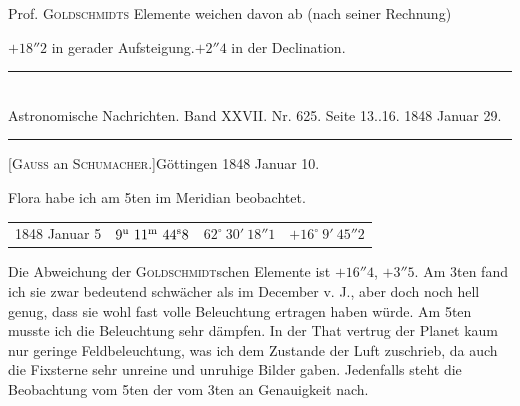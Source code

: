 Prof. \textsc{Goldschmidts} Elemente weichen davon ab (nach seiner Rechnung)

\begin{center}
$+18''2$ in gerader Aufsteigung.\qquad $+2''4$ in der Declination.
\end{center}

\clearpage
\hypertarget{native-481-january10}{}
\begin{center}
\rule{0.55\linewidth}{0.4pt}\\[2pt]
Astronomische Nachrichten. Band XXVII. Nr. 625. Seite 13..16. 1848 Januar 29.\\[2pt]
\rule{0.55\linewidth}{0.4pt}
\end{center}
\begin{center}[\textsc{Gauss} an \textsc{Schumacher}.]\quad Göttingen 1848 Januar 10.\end{center}

Flora habe ich am 5ten im Meridian beobachtet.

\begin{center}
\setlength{\tabcolsep}{4pt}
\begin{tabular}{l|r|r|r}
1848 Januar 5 & $9^{\rm u}\ 11^{\rm m}\ 44^{\rm s}8$ & $62^\circ\ 30'\ 18''1$ & $+16^\circ\ 9'\ 45''2$ \\
\end{tabular}
\end{center}

Die Abweichung der \textsc{Goldschmidt}schen Elemente ist $+16''4$, $+3''5$. Am 3ten fand ich sie zwar bedeutend schwächer als im December v. J., aber doch noch hell genug, dass sie wohl fast volle Beleuchtung ertragen haben würde. Am 5ten musste ich die Beleuchtung sehr dämpfen. In der That vertrug der Planet kaum nur geringe Feldbeleuchtung, was ich dem Zustande der Luft zuschrieb, da auch die Fixsterne sehr unreine und unruhige Bilder gaben. Jedenfalls steht die Beobachtung vom 5ten der vom 3ten an Genauigkeit nach.
